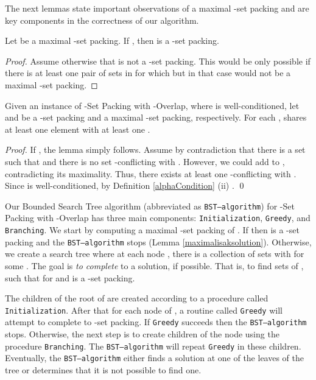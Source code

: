 The next lemmas state important observations of a maximal -set packing and are key components in the correctness of our algorithm.

\begin{lemma}\label{maximalisaksolution}
Let  be a maximal -set packing. If , then  is a -set packing.
\end{lemma}

\begin{proof}
Assume otherwise that  is not a -set packing. This would be only possible if there is at least one pair of sets  in  for which  but in that case  would not be a  maximal -set packing. 
\end{proof}

\begin{lemma}\label{intersectionLemma}
Given an instance  of -Set Packing with -Overlap, where  is well-conditioned, let  and  be a -set packing and a maximal -set packing, respectively. 
For each ,  shares at least one element with at least one . 
\end{lemma}

\begin{proof}
If , the lemma simply follows. 
Assume by contradiction that there is a set  such that  and there is no set  -conflicting with . However,  we could add  to , contradicting its maximality. 
Thus, there exists at least one  -conflicting with .
Since  is well-conditioned, by Definition \ref{alphaCondition} (ii) . \qed
\end{proof}


Our Bounded Search Tree algorithm (abbreviated as \texttt{BST--algorithm}) for -Set Packing with -Overlap has three main components: \texttt{Initialization}, \texttt{Greedy}, and \texttt{Branching}. We start by computing a maximal -set packing  of . If  then  is a -set packing and the \texttt{BST--algorithm} stops (Lemma \ref{maximalisaksolution}). Otherwise, we create a search tree  where at each node , there is a collection of sets  with  for some . The goal is \emph{to complete}  to a solution, if possible. That is, to find  sets  of , such that  for  and  is a -set packing. 

The children of the root of  are created according to a procedure called \texttt{Initialization}. After that for each node  of , a routine called \texttt{Greedy} will attempt to complete  to -set packing. If \texttt{Greedy} succeeds then the \texttt{BST--algorithm} stops. Otherwise, the next step is to create children of the node  using the procedure \texttt{Branching}. The \texttt{BST--algorithm} will repeat \texttt{Greedy} in these children. 
Eventually, the \texttt{BST--algorithm} either finds a solution at one of the leaves of the tree or determines that it is not possible to find one. 

